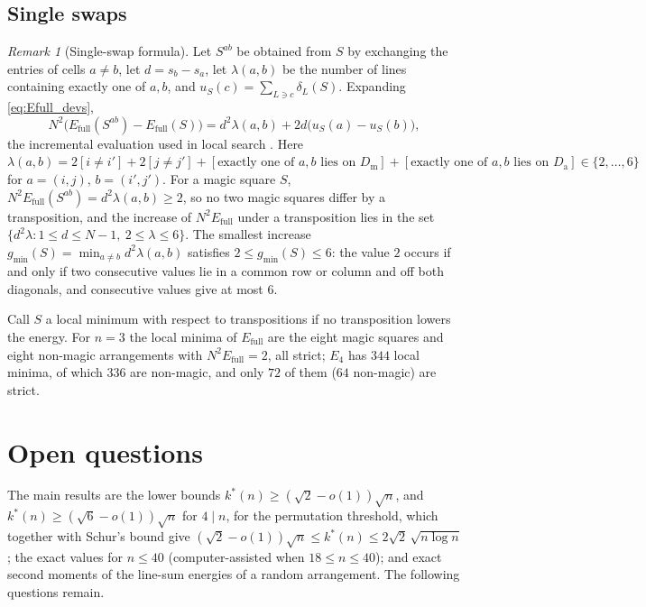 \documentclass[11pt,a4paper]{article}
\theoremstyle{plain}
\theoremstyle{definition}
\theoremstyle{remark}
\newtheorem{remark}[theorem]{Remark}
\newcommand{\Efull}{E_{\mathrm{full}}}
\newcommand{\Efour}{E_4}
\begin{document}
\subsection{Single swaps}
\label{sec:swap-gaps}

\begin{remark}[Single-swap formula]
\label{rem:swap}
Let $S^{ab}$ be obtained from $S$ by exchanging the entries of cells $a\ne b$, let $d=s_b-s_a$, let $\lambda(a,b)$ be the number of lines containing exactly one of $a,b$, and $u_S(c)=\sum_{L\ni c}\delta_L(S)$.
Expanding \eqref{eq:Efull_devs},
\[
N^{2}\bigl(\Efull(S^{ab})-\Efull(S)\bigr)=d^{2}\lambda(a,b)+2d\bigl(u_S(a)-u_S(b)\bigr),
\]
the incremental evaluation used in local search \cite{pinn1998number}.
Here $\lambda(a,b)=2[i\ne i']+2[j\ne j']+[\text{exactly one of }a,b\text{ lies on }D_{\mathrm m}]+[\text{exactly one of }a,b\text{ lies on }D_{\mathrm a}]\in\{2,\dots,6\}$ for $a=(i,j)$, $b=(i',j')$.
For a magic square $S$, $N^2\Efull(S^{ab})=d^2\lambda(a,b)\ge2$, so no two magic squares differ by a transposition, and the increase of $N^2\Efull$ under a transposition lies in the set $\{d^2\lambda:1\le d\le N-1,\ 2\le\lambda\le6\}$.
The smallest increase $g_{\min}(S)=\min_{a\ne b}d^2\lambda(a,b)$ satisfies $2\le g_{\min}(S)\le6$: the value $2$ occurs if and only if two consecutive values lie in a common row or column and off both diagonals, and consecutive values give at most $6$.
\end{remark}

Call $S$ a local minimum with respect to transpositions if no transposition lowers the energy.
For $n=3$ the local minima of $\Efull$ are the eight magic squares and eight non-magic arrangements with $N^2\Efull=2$, all strict; $\Efour$ has $344$ local minima, of which $336$ are non-magic, and only $72$ of them ($64$ non-magic) are strict.


\section{Open questions}
\label{sec:discussion}

The main results are the lower bounds $k^*(n)\ge(\sqrt2-o(1))\sqrt n$, and $k^*(n)\ge(\sqrt6-o(1))\sqrt n$ for $4\mid n$, for the permutation threshold, which together with Schur's bound give $(\sqrt2-o(1))\sqrt n\le k^*(n)\le2\sqrt2\,\sqrt{n\log n}$; the exact values for $n\le40$ (computer-assisted when $18\le n\le40$); and exact second moments of the line-sum energies of a random arrangement.
The following questions remain.
\end{document}

